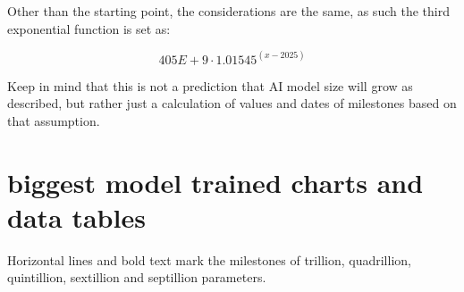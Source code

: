 \documentclass[a4paper]{article}
\begin{document}
	\medskip
	
	Other than the starting point, the considerations are the same, as such the third exponential function is set as:
	
	$$ 405E+9 \cdot 1.01545^{(x-2025)} $$
	
	\bigskip
	
	Keep in mind that this is not a prediction that AI model size will grow as described, but rather just a calculation of values and dates of milestones based on that assumption.
	
	\pagebreak
	
	\section{biggest model trained charts and data tables}
	
	Horizontal lines and bold text mark the milestones of trillion, quadrillion, quintillion, sextillion and septillion parameters.
	
\end{document}

